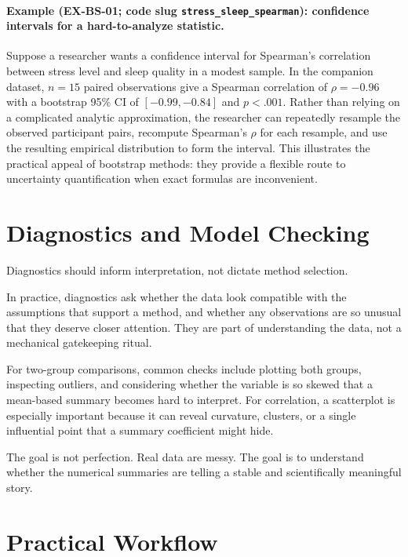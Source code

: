 \documentclass[11pt]{article}
\begin{document}
\paragraph{Example (EX-BS-01; code slug \texttt{stress\_sleep\_spearman}): confidence intervals for a hard-to-analyze statistic.}
Suppose a researcher wants a confidence interval for Spearman's correlation between stress level and sleep quality in a modest sample. In the companion dataset, $n = 15$ paired observations give a Spearman correlation of $\rho = -0.96$ with a bootstrap 95\% CI of $[-0.99, -0.84]$ and $p < .001$. Rather than relying on a complicated analytic approximation, the researcher can repeatedly resample the observed participant pairs, recompute Spearman's $\rho$ for each resample, and use the resulting empirical distribution to form the interval. This illustrates the practical appeal of bootstrap methods: they provide a flexible route to uncertainty quantification when exact formulas are inconvenient.

\section{Diagnostics and Model Checking}

Diagnostics should inform interpretation, not dictate method selection.

In practice, diagnostics ask whether the data look compatible with the assumptions that support a method, and whether any observations are so unusual that they deserve closer attention. They are part of understanding the data, not a mechanical gatekeeping ritual.

For two-group comparisons, common checks include plotting both groups, inspecting outliers, and considering whether the variable is so skewed that a mean-based summary becomes hard to interpret. For correlation, a scatterplot is especially important because it can reveal curvature, clusters, or a single influential point that a summary coefficient might hide.

The goal is not perfection. Real data are messy. The goal is to understand whether the numerical summaries are telling a stable and scientifically meaningful story.

\section{Practical Workflow}
\end{document}
